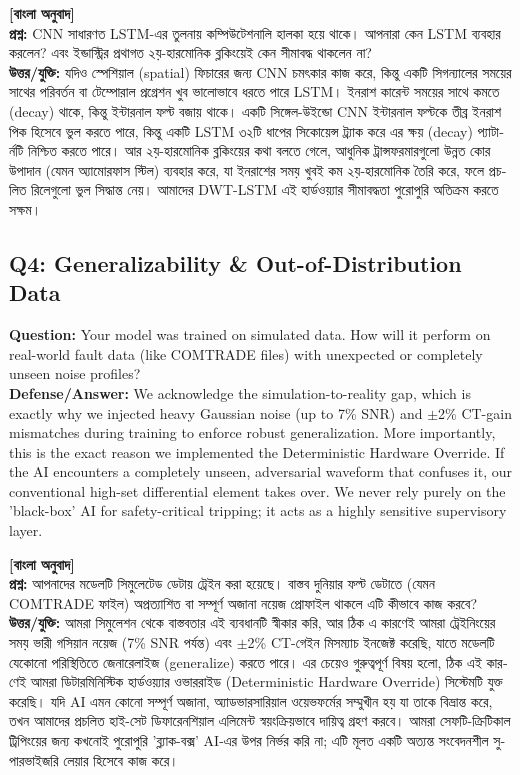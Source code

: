 \documentclass[12pt]{article}
\begin{document}
\begin{bengali}
\textbf{[বাংলা অনুবাদ]} \\
\textbf{প্রশ্ন:} CNN সাধারণত LSTM-এর তুলনায় কম্পিউটেশনালি হালকা হয়ে থাকে। আপনারা কেন LSTM ব্যবহার করলেন? এবং ইন্ডাস্ট্রির প্রথাগত ২য়-হারমোনিক ব্লকিংয়েই কেন সীমাবদ্ধ থাকলেন না? \\
\textbf{উত্তর/যুক্তি:} যদিও স্পেশিয়াল (spatial) ফিচারের জন্য CNN চমৎকার কাজ করে, কিন্তু একটি সিগন্যালের সময়ের সাথের পরিবর্তন বা টেম্পোরাল প্রগ্রেশন খুব ভালোভাবে ধরতে পারে LSTM। ইনরাশ কারেন্ট সময়ের সাথে কমতে (decay) থাকে, কিন্তু ইন্টারনাল ফল্ট বজায় থাকে। একটি সিঙ্গেল-উইন্ডো CNN ইন্টারনাল ফল্টকে তীব্র ইনরাশ পিক হিসেবে ভুল করতে পারে, কিন্তু একটি LSTM ৩২টি ধাপের সিকোয়েন্স ট্র্যাক করে এর ক্ষয় (decay) প্যাটার্নটি নিশ্চিত করতে পারে। আর ২য়-হারমোনিক ব্লকিংয়ের কথা বলতে গেলে, আধুনিক ট্রান্সফরমারগুলো উন্নত কোর উপাদান (যেমন অ্যামোরফাস স্টিল) ব্যবহার করে, যা ইনরাশের সময় খুবই কম ২য়-হারমোনিক তৈরি করে, ফলে প্রচলিত রিলেগুলো ভুল সিদ্ধান্ত নেয়। আমাদের DWT-LSTM এই হার্ডওয়্যার সীমাবদ্ধতা পুরোপুরি অতিক্রম করতে সক্ষম।
\end{bengali}

\subsection*{Q4: Generalizability \& Out-of-Distribution Data}
\textbf{Question:} Your model was trained on simulated data. How will it perform on real-world fault data (like COMTRADE files) with unexpected or completely unseen noise profiles? \\
\textbf{Defense/Answer:} We acknowledge the simulation-to-reality gap, which is exactly why we injected heavy Gaussian noise (up to 7\% SNR) and $\pm$2\% CT-gain mismatches during training to enforce robust generalization. More importantly, this is the exact reason we implemented the Deterministic Hardware Override. If the AI encounters a completely unseen, adversarial waveform that confuses it, our conventional high-set differential element takes over. We never rely purely on the 'black-box' AI for safety-critical tripping; it acts as a highly sensitive supervisory layer.

\begin{bengali}
\textbf{[বাংলা অনুবাদ]} \\
\textbf{প্রশ্ন:} আপনাদের মডেলটি সিমুলেটেড ডেটায় ট্রেইন করা হয়েছে। বাস্তব দুনিয়ার ফল্ট ডেটাতে (যেমন COMTRADE ফাইল) অপ্রত্যাশিত বা সম্পূর্ণ অজানা নয়েজ প্রোফাইল থাকলে এটি কীভাবে কাজ করবে? \\
\textbf{উত্তর/যুক্তি:} আমরা সিমুলেশন থেকে বাস্তবতার এই ব্যবধানটি স্বীকার করি, আর ঠিক এ কারণেই আমরা ট্রেইনিংয়ের সময় ভারী গসিয়ান নয়েজ (7\% SNR পর্যন্ত) এবং $\pm$2\% CT-গেইন মিসম্যাচ ইনজেক্ট করেছি, যাতে মডেলটি যেকোনো পরিস্থিতিতে জেনারেলাইজ (generalize) করতে পারে। এর চেয়েও গুরুত্বপূর্ণ বিষয় হলো, ঠিক এই কারণেই আমরা ডিটারমিনিস্টিক হার্ডওয়্যার ওভাররাইড (Deterministic Hardware Override) সিস্টেমটি যুক্ত করেছি। যদি AI এমন কোনো সম্পূর্ণ অজানা, অ্যাডভারসারিয়াল ওয়েভফর্মের সম্মুখীন হয় যা তাকে বিভ্রান্ত করে, তখন আমাদের প্রচলিত হাই-সেট ডিফারেনশিয়াল এলিমেন্ট স্বয়ংক্রিয়ভাবে দায়িত্ব গ্রহণ করবে। আমরা সেফটি-ক্রিটিকাল ট্রিপিংয়ের জন্য কখনোই পুরোপুরি 'ব্ল্যাক-বক্স' AI-এর উপর নির্ভর করি না; এটি মূলত একটি অত্যন্ত সংবেদনশীল সুপারভাইজরি লেয়ার হিসেবে কাজ করে।
\end{bengali}
\end{document}
